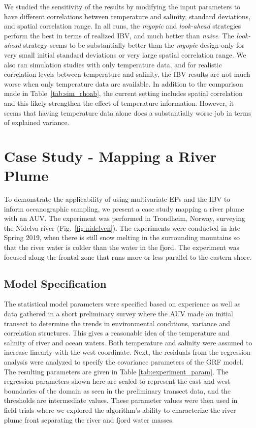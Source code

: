 \documentclass[aoas,preprint]{imsart}
\begin{document}
We studied the sensitivity of the results by modifying the input
parameters to have different correlations between temperature and
salinity, standard deviations, and spatial correlation range.  In all
runs, the \textit{myopic} and \textit{look-ahead} strategies perform
the best in terms of realized IBV, and much better than
\textit{naive}. The \textit{look-ahead} strategy seems to be
substantially better than the \textit{myopic} design only for very
small initial standard deviations or very large spatial correlation
range. 
We also ran simulation studies with only temperature data, and for
realistic correlation levels between temperature and salinity, the IBV
results are not much worse when only temperature data are
available. In addition to the comparison made in
Table~\ref{tab:sim_rhoab}, the current setting includes spatial
correlation and this likely strengthen the effect of temperature information. However, it seems that having temperature data alone
does a substantially worse job in terms of explained variance.

\section{Case Study - Mapping a River Plume}
\label{sec:case_study}

To demonstrate the applicability of using multivariate EPs and the IBV
to inform oceanographic sampling, we present a case study mapping a
river plume with an AUV. The experiment was performed in Trondheim,
Norway, surveying the Nidelva river (Fig.~\ref{fig:nidelven}). The
experiments were conducted in late Spring 2019, when there is still
snow melting in the surrounding mountains so that the river water is colder than the water in the fjord. The experiment was
focused along the frontal zone that runs more or less parallel to the
eastern shore.

\subsection{Model Specification}
\label{sec:exp_modeling}

The statistical model parameters were specified based on experience as well as data gathered in a short
preliminary survey where the AUV made an initial transect to determine
the trends in environmental conditions, variance and correlation
structures. This gives a reasonable idea of the temperature and salinity of river and ocean waters. Both temperature and salinity were assumed to increase linearly with the west coordinate. Next, the residuals from the regression analysis were analyzed to specify the covariance parameters of the GRF model.
The resulting
parameters are given in Table \ref{tab:experiment_param}. The
regression parameters shown here are scaled to represent the east and
west boundaries of the domain as seen in the preliminary transect
data, and the thresholds are intermediate values. These parameter
values were then used in field trials where we explored the
algorithm's ability to characterize the river plume front separating
the river and fjord water masses.
\end{document}
